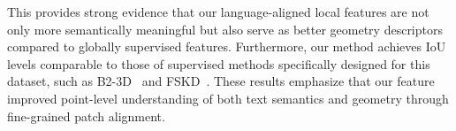 This provides strong evidence that our language-aligned local features are not only more semantically meaningful but also serve as better geometry descriptors compared to globally supervised features. Furthermore, our method achieves IoU levels comparable to those of supervised methods specifically designed for this dataset, such as B2-3D~\cite{wimmer2024back} and FSKD~\cite{attaiki2022ncp}. These results emphasize that our feature improved point-level understanding of both text semantics and geometry through fine-grained patch alignment.

